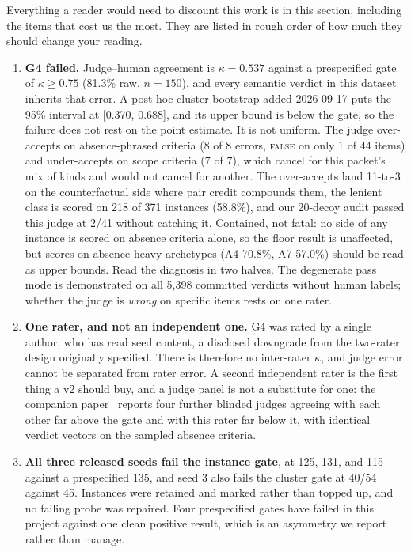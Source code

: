 \documentclass[11pt]{article}
\begin{document}
Everything a reader would need to discount this work is in this section,
including the items that cost us the most. They are listed in rough order of how
much they should change your reading.

\begin{enumerate}[leftmargin=*, itemsep=.3em]
\item \textbf{G4 failed.} Judge--human agreement is $\kappa = 0.537$ against a
prespecified gate of $\kappa \geq 0.75$ (81.3\% raw, $n=150$), and every semantic
verdict in this dataset inherits that error. A post-hoc cluster bootstrap added
2026-09-17 puts the 95\% interval at [0.370, 0.688], and its upper bound is below
the gate, so the failure does not rest on the point estimate. It is not uniform. The judge
over-accepts on absence-phrased criteria (8 of 8 errors, \textsc{false} on only 1
of 44 items) and under-accepts on scope criteria (7 of 7), which cancel for this packet's mix of kinds and would not cancel for
another. The over-accepts land 11-to-3 on the counterfactual side where pair
credit compounds them, the lenient class is scored on 218 of 371 instances
(58.8\%), and our 20-decoy audit passed this judge at 2/41 without catching it. Contained, not fatal: no side
of any instance is scored on absence criteria alone, so the floor result is
unaffected, but scores on absence-heavy archetypes (A4 70.8\%, A7 57.0\%) should
be read as upper bounds. Read the diagnosis in two halves. The degenerate pass
mode is demonstrated on all 5{,}398 committed verdicts without human labels;
whether the judge is \emph{wrong} on specific items rests on one rater.

\item \textbf{One rater, and not an independent one.} G4 was rated by a single
author, who has read seed content, a disclosed downgrade from the two-rater design
originally specified. There is therefore no inter-rater $\kappa$, and judge error cannot be separated
from rater error. A second independent rater is the first thing a v2 should buy,
and a judge panel is not a substitute for one: the companion
paper~\cite{pipeline} reports four further blinded judges agreeing with each
other far above the gate and with this rater far below it, with identical verdict
vectors on the sampled absence criteria.

\item \textbf{All three released seeds fail the instance gate}, at 125, 131, and
115 against a prespecified 135, and seed 3 also fails the cluster gate at
40/54 against 45. Instances were retained and marked rather than topped up, and no
failing probe was repaired. Four prespecified gates have failed in this project
against one clean positive result, which is an asymmetry we report rather than
manage.


\end{enumerate}
\end{document}
